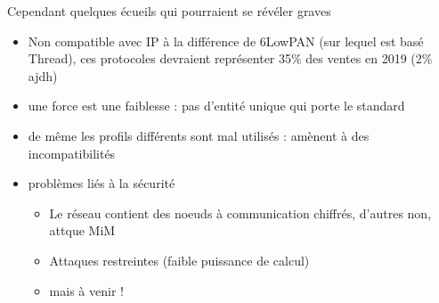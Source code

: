 \documentclass{beamer}
\begin{document}
\begin{frame}
	  \begin{block}{Cependant quelques écueils qui pourraient se révéler graves}
	  \begin {itemize}
  \item Non compatible avec IP à la différence de 6LowPAN (sur lequel est basé Thread), ces protocoles devraient représenter 35\% des ventes en 2019 (2\% ajdh)
  \item une force est une faiblesse : pas d'entité unique qui porte le standard 
  \item de même les profils différents sont mal utilisés : amènent à des incompatibilités
  \item problèmes liés à la sécurité
\begin{itemize}
	\item Le réseau contient des noeuds à communication chiffrés, d'autres non, attque MiM
	\item Attaques restreintes (faible puissance de calcul)
	\item mais à venir !
\end{itemize}
  \end{itemize}
\end{block}
  \end{frame}

  
\end{document}
